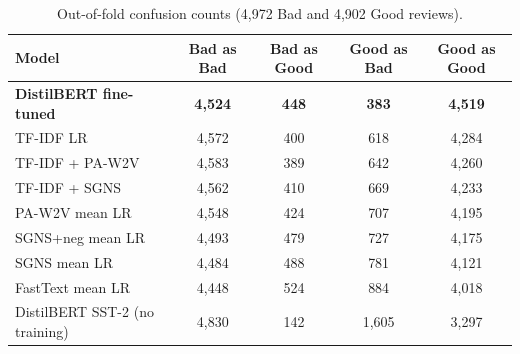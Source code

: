 \begin{table}[H]
\centering
\footnotesize
\caption{Out-of-fold confusion counts (4,972 Bad and 4,902 Good reviews).}
\label{tab:sentconfusion}
\begin{tabular}{lcccc}
\toprule
Model & Bad as Bad & Bad as Good & Good as Bad & Good as Good \\
\midrule
\textbf{DistilBERT fine-tuned} & \textbf{4,524} & \textbf{448} & \textbf{383} & \textbf{4,519} \\
TF-IDF LR & 4,572 & 400 & 618 & 4,284 \\
TF-IDF + PA-W2V & 4,583 & 389 & 642 & 4,260 \\
TF-IDF + SGNS & 4,562 & 410 & 669 & 4,233 \\
PA-W2V mean LR & 4,548 & 424 & 707 & 4,195 \\
SGNS+neg mean LR & 4,493 & 479 & 727 & 4,175 \\
SGNS mean LR & 4,484 & 488 & 781 & 4,121 \\
FastText mean LR & 4,448 & 524 & 884 & 4,018 \\
DistilBERT SST-2 (no training) & 4,830 & 142 & 1,605 & 3,297 \\
\bottomrule
\end{tabular}
\end{table}